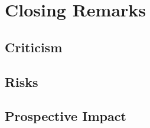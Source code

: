 \chapter{Closing Remarks}
\label{cha:ClosingRemarks}

\section{Criticism}
\section{Risks}
\section{Prospective Impact}